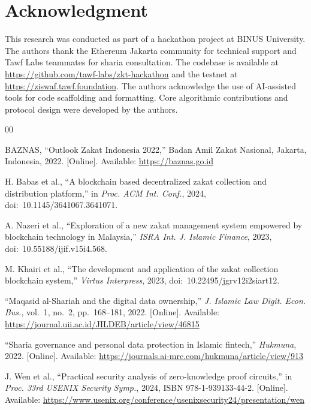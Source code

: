 \documentclass[conference]{IEEEtran}
\begin{document}
\section*{Acknowledgment}

This research was conducted as part of a hackathon project at BINUS University. The authors thank the Ethereum Jakarta community for technical support and Tawf Labs teammates for sharia consultation. The codebase is available at \url{https://github.com/tawf-labs/zkt-hackathon} and the testnet at \url{https://ziswaf.tawf.foundation}. The authors acknowledge the use of AI-assisted tools for code scaffolding and formatting. Core algorithmic contributions and protocol design were developed by the authors.

\begin{thebibliography}{00}

BAZNAS, ``Outlook Zakat Indonesia 2022,'' Badan Amil Zakat Nasional, Jakarta, Indonesia, 2022. [Online]. Available: \url{https://baznas.go.id}

H. Babas et al., ``A blockchain based decentralized zakat collection and distribution platform,'' in \textit{Proc. ACM Int. Conf.}, 2024, doi:~10.1145/3641067.3641071.

A. Nazeri et al., ``Exploration of a new zakat management system empowered by blockchain technology in Malaysia,'' \textit{ISRA Int. J. Islamic Finance}, 2023, doi:~10.55188/ijif.v15i4.568.

M. Khairi et al., ``The development and application of the zakat collection blockchain system,'' \textit{Virtus Interpress}, 2023, doi:~10.22495/jgrv12i2siart12.

``Maqasid al-Shariah and the digital data ownership,'' \textit{J. Islamic Law Digit. Econ. Bus.}, vol.~1, no.~2, pp.~168--181, 2022. [Online]. Available: \url{https://journal.uii.ac.id/JILDEB/article/view/46815}

``Sharia governance and personal data protection in Islamic fintech,'' \textit{Hukmuna}, 2022. [Online]. Available: \url{https://journals.ai-mrc.com/hukmuna/article/view/913}

J. Wen et al., ``Practical security analysis of zero-knowledge proof circuits,'' in \textit{Proc. 33rd USENIX Security Symp.}, 2024, ISBN 978-1-939133-44-2. [Online]. Available: \url{https://www.usenix.org/conference/usenixsecurity24/presentation/wen}


\end{thebibliography}
\end{document}
